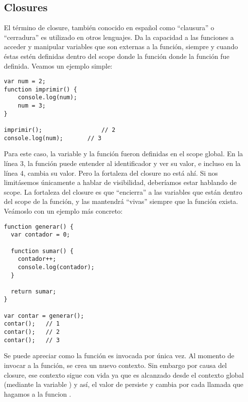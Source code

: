 
\subsection{Closures}
\label{sec:closures}

El término de closure, también conocido en español como "`clausura"' o "`cerradura"' es utilizado en otros lenguajes. Da la capacidad a las funciones a acceder y manipular variables que son externas a la función, siempre y cuando éstas estén definidas dentro del scope donde la función donde la función fue definida. Veamos un ejemplo simple:

\begin{lstlisting}[title={Creando un closure simple}]
var num = 2;
function imprimir() {
	console.log(num);
	num = 3;
}

imprimir();					// 2
console.log(num);		// 3
\end{lstlisting}

Para este caso, la variable  y la función  fueron definidas en el scope global. En la línea 3, la función puede entender al identificador  y ver su valor, e incluso en la línea 4, cambia su valor. Pero la fortaleza del closure no está ahí. Si nos limitásemos únicamente a hablar de visibilidad, deberíamos estar hablando de scope. La fortaleza del closure es que "`encierra"' a las variables que están dentro del scope de la función, y las mantendrá "`vivas"' siempre que la función exista. Veámoslo con un ejemplo más concreto:

\begin{lstlisting}[title={Analizando otro closure}]
function generar() {
  var contador = 0;

  function sumar() {
    contador++;
    console.log(contador);
  }

  return sumar;
}

var contar = generar();
contar();	// 1
contar();	// 2
contar();	// 3
\end{lstlisting}

Se puede apreciar como la función  es invocada por única vez. Al momento de invocar a la función, se crea un nuevo contexto. Sin embargo por causa del closure, ese contexto sigue con vida ya que es alcanzado desde el contexto global (mediante la variable ) y así, el valor de  persiste y cambia por cada llamada que hagamos a la funcion .
